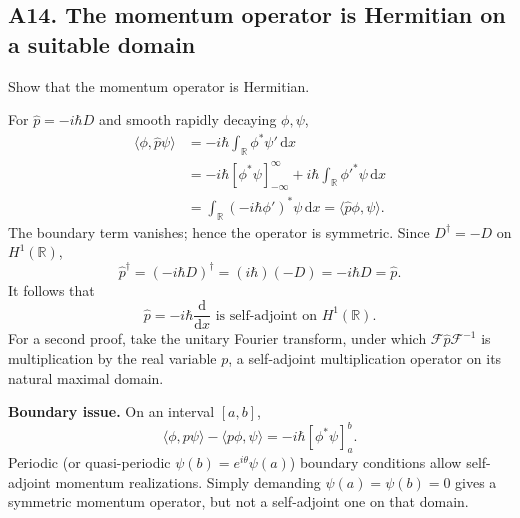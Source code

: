 \documentclass[11pt,a4paper]{article}
\newcommand{\dd}{\mathrm{d}}
\newcommand{\R}{\mathbb R}
\begin{document}
\subsection{A14. The momentum operator is Hermitian on a suitable domain}
\begin{questionbox}Show that the momentum operator is Hermitian.\end{questionbox}
For $\hat p=-i\hbar D$ and smooth rapidly decaying $\phi,\psi$,
\begin{align}
\langle\phi,\hat p\psi\rangle
&=-i\hbar\int_{\R}\phi^*\psi'\,\dd x\\
&=-i\hbar[\phi^*\psi]_{-\infty}^{\infty}+i\hbar\int_{\R}\phi'^*\psi\,\dd x\\
&=\int_{\R}(-i\hbar\phi')^*\psi\,\dd x
=\langle\hat p\phi,\psi\rangle.
\end{align}
The boundary term vanishes; hence the operator is symmetric. Since $D^\dagger=-D$ on $H^1(\R)$,
\begin{equation}
\hat p^\dagger=(-i\hbar D)^\dagger=(i\hbar)(-D)=-i\hbar D=\hat p.
\end{equation}
It follows that
\begin{equation}\boxed{\hat p=-i\hbar\frac{\dd}{\dd x}\text{ is self-adjoint on }H^1(\R).}\end{equation}
For a second proof, take the unitary Fourier transform, under which $\mathcal F\hat p\mathcal F^{-1}$ is multiplication by the real variable $p$, a self-adjoint multiplication operator on its natural maximal domain.\par
\textbf{Boundary issue.} On an interval $[a,b]$,
\begin{equation}
\langle\phi,p\psi\rangle-\langle p\phi,\psi\rangle=-i\hbar[\phi^*\psi]_a^b.
\end{equation}
Periodic (or quasi-periodic $\psi(b)=e^{i\theta}\psi(a)$) boundary conditions allow self-adjoint momentum realizations. Simply demanding $\psi(a)=\psi(b)=0$ gives a symmetric momentum operator, but not a self-adjoint one on that domain.
\end{document}
